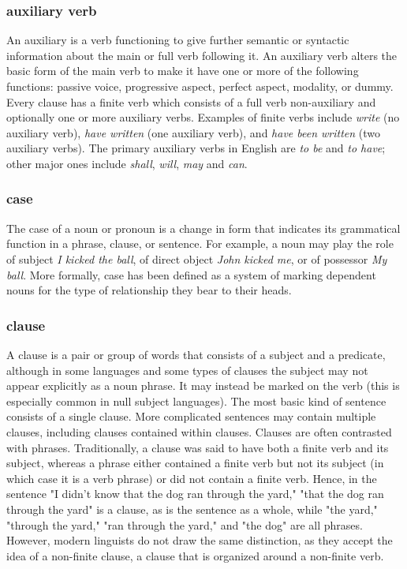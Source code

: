 \begin{small}
\subsubsection{auxiliary verb}
An auxiliary is a verb functioning to give further semantic or syntactic information about the main or full verb following it.  An auxiliary verb alters the basic form of the main verb to make it have one or more of the following functions: passive voice, progressive aspect, perfect aspect, modality, or dummy.
Every clause has a finite verb which consists of a full verb non-auxiliary and optionally one or more auxiliary verbs.
Examples of finite verbs include \emph{write} (no auxiliary verb), \emph{have written} (one auxiliary verb), and \emph{have been written} (two auxiliary verbs).  The primary auxiliary verbs in English are \emph{to be} and \emph{to have}; other major ones include \emph{shall}, \emph{will}, \emph{may} and \emph{can}.

\subsubsection{case}
The case of a noun or pronoun is a change in form that indicates its grammatical function in a phrase, clause, or sentence.  For example, a noun may play the role of subject \emph{I kicked the ball}, of direct object \emph{John kicked me}, or of possessor \emph{My ball}.  More formally, case has been defined as a system of marking dependent nouns for the type of relationship they bear to their heads.

\subsubsection{clause}
A clause is a pair or group of words that consists of a subject and a predicate, although in some languages and some types of clauses the subject may not appear explicitly as a noun phrase. It may instead be marked on the verb (this is especially common in null subject languages). The most basic kind of sentence consists of a single clause. More complicated sentences may contain multiple clauses, including clauses contained within clauses.  Clauses are often contrasted with phrases. Traditionally, a clause was said to have both a finite verb and its subject, whereas a phrase either contained a finite verb but not its subject (in which case it is a verb phrase) or did not contain a finite verb. Hence, in the sentence "I didn't know that the dog ran through the yard," "that the dog ran through the yard" is a clause, as is the sentence as a whole, while "the yard," "through the yard," "ran through the yard," and "the dog" are all phrases. However, modern linguists do not draw the same distinction, as they accept the idea of a non-finite clause, a clause that is organized around a non-finite verb.


\end{small}
